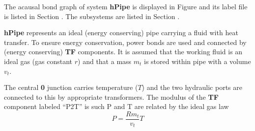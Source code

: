 

   The acausal bond graph of system \textbf{hPipe} is
   displayed in Figure  and its label
   file is listed in Section .
   The subsystems are listed in Section .
   

\textbf{hPipe} represents an ideal (energy conserving) pipe carrying a
fluid with heat transfer. To ensure energy conservation, power bonds are used and
connected by (energy conserving) \textbf{TF} components.
It is assumed that the working fluid is an ideal gas (gas constant $r$) and that a mass
$m_t$ is stored within pipe with a volume $v_t$.

The central \textbf{0} junction carries temperature ($T$) and the two
hydraulic ports are connected to this by appropriate transformers.
The modulus of the \textbf{TF} component labeled ``P2T'' is such P and
T are related by the ideal gas law
\begin{equation}
  P = \frac{Rm_t}{v_t} T
\end{equation}


